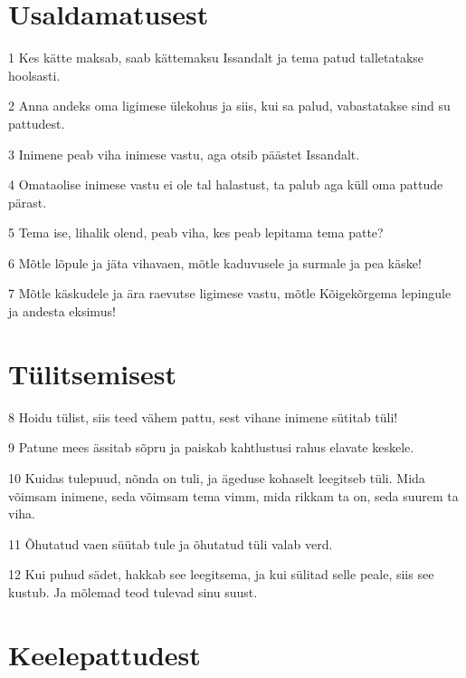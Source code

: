 \section*{Usaldamatusest}

\par 1 Kes kätte maksab, saab kättemaksu Issandalt ja tema patud talletatakse hoolsasti.
\par 2 Anna andeks oma ligimese ülekohus ja siis, kui sa palud, vabastatakse sind su pattudest.
\par 3 Inimene peab viha inimese vastu, aga otsib päästet Issandalt.
\par 4 Omataolise inimese vastu ei ole tal halastust, ta palub aga küll oma pattude pärast.
\par 5 Tema ise, lihalik olend, peab viha, kes peab lepitama tema patte?
\par 6 Mõtle lõpule ja jäta vihavaen, mõtle kaduvusele ja surmale ja pea käske!
\par 7 Mõtle käskudele ja ära raevutse ligimese vastu, mõtle Kõigekõrgema lepingule ja andesta eksimus!

\section*{Tülitsemisest}

\par 8 Hoidu tülist, siis teed vähem pattu, sest vihane inimene sütitab tüli!
\par 9 Patune mees ässitab sõpru ja paiskab kahtlustusi rahus elavate keskele.
\par 10 Kuidas tulepuud, nõnda on tuli, ja ägeduse kohaselt leegitseb tüli. Mida võimsam inimene, seda võimsam tema vimm, mida rikkam ta on, seda suurem ta viha.
\par 11 Õhutatud vaen süütab tule ja õhutatud tüli valab verd.
\par 12 Kui puhud sädet, hakkab see leegitsema, ja kui sülitad selle peale, siis see kustub. Ja mõlemad teod tulevad sinu suust.

\section*{Keelepattudest}

